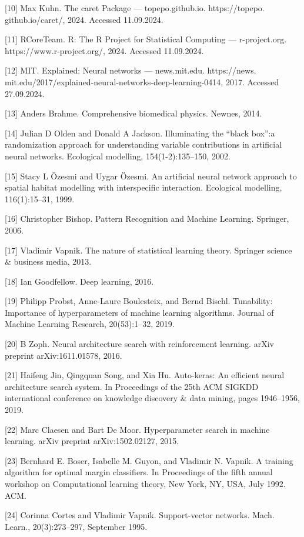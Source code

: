 \documentclass[preprint,12pt]{elsarticle}
\begin{document}
[10] Max Kuhn. The caret Package — topepo.github.io. https://topepo. github.io/caret/, 2024. Accessed 11.09.2024. 

[11] RCoreTeam. R: The R Project for Statistical Computing — r-project.org. https://www.r-project.org/, 2024. Accessed 11.09.2024. 

[12] MIT. Explained: Neural networks — news.mit.edu. https://news. mit.edu/2017/explained-neural-networks-deep-learning-0414, 2017. Accessed 27.09.2024. 

[13] Anders Brahme. Comprehensive biomedical physics. Newnes, 2014. 

[14] Julian D Olden and Donald A Jackson. Illuminating the “black box”:a randomization approach for understanding variable contributions in artificial neural networks. Ecological modelling, 154(1-2):135–150, 2002. 

[15] Stacy L Özesmi and Uygar Özesmi. An artificial neural network approach to spatial habitat modelling with interspecific interaction. Ecological modelling, 116(1):15–31, 1999. 

[16] Christopher Bishop. Pattern Recognition and Machine Learning. Springer, 2006. 

[17] Vladimir Vapnik. The nature of statistical learning theory. Springer science & business media, 2013. 

[18] Ian Goodfellow. Deep learning, 2016. 

[19] Philipp Probst, Anne-Laure Boulesteix, and Bernd Bischl. Tunability: Importance of hyperparameters of machine learning algorithms. Journal of Machine Learning Research, 20(53):1–32, 2019. 

[20] B Zoph. Neural architecture search with reinforcement learning. arXiv preprint arXiv:1611.01578, 2016. 

[21] Haifeng Jin, Qingquan Song, and Xia Hu. Auto-keras: An efficient neural architecture search system. In Proceedings of the 25th ACM SIGKDD international conference on knowledge discovery & data mining, pages 1946–1956, 2019. 

[22] Marc Claesen and Bart De Moor. Hyperparameter search in machine learning. arXiv preprint arXiv:1502.02127, 2015. 

[23] Bernhard E. Boser, Isabelle M. Guyon, and Vladimir N. Vapnik. A training algorithm for optimal margin classifiers. In Proceedings of the fifth annual workshop on Computational learning theory, New York, NY, USA, July 1992. ACM. 

[24] Corinna Cortes and Vladimir Vapnik. Support-vector networks. Mach. Learn., 20(3):273–297, September 1995. 
\end{document}
